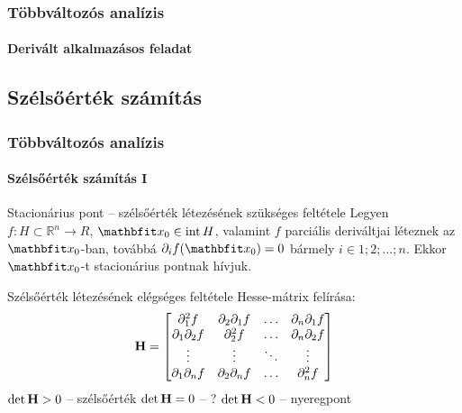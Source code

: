 \begin{frame}
  \frametitle{Többváltozós analízis}
  \framesubtitle{Derivált alkalmazásos feladat}

  
\end{frame}

\subsection{Szélsőérték számítás}

\begin{frame}
  \frametitle{Többváltozós analízis}
  \framesubtitle{Szélsőérték számítás I}

  \begin{block}{Stacionárius pont -- szélsőérték létezésének szükséges feltétele}
    Legyen $f : H \subset \mathbb R^n \rightarrow R$, $\rvec x_0 \in \mathrm{int}\, H$,
    valamint $f$ parciális deriváltjai léteznek az $\rvec x_0$-ban, továbbá
    $\partial_i f(\rvec x_0) = 0$ bármely $i \in {1; 2; \dots; n}$. Ekkor
    $\rvec x_0$-t stacionárius pontnak hívjuk.
  \end{block}

  \begin{block}{Szélsőérték létezésének elégséges feltétele}
    Hesse-mátrix felírása:
    \def\arraystretch{1.25}
    \[
      \mathbf{H} = \begin{bmatrix}
        \partial^2_1 f          & \partial_2 \partial_1 f & \hdots & \partial_n \partial_1 f \\
        \partial_1 \partial_2 f & \partial^2_2 f          & \hdots & \partial_n \partial_2 f \\
        \vdots                  & \vdots                  & \ddots & \vdots                  \\
        \partial_1 \partial_n f & \partial_2 \partial_n f & \hdots & \partial^2_n f          \\
      \end{bmatrix}
    \]
    $\det \mathbf{H} > 0$ -- szélsőérték
    \hfill
    $\det \mathbf{H} = 0$ -- ?
    \hfill
    $\det \mathbf{H} < 0$ -- nyeregpont
  \end{block}
\end{frame}

